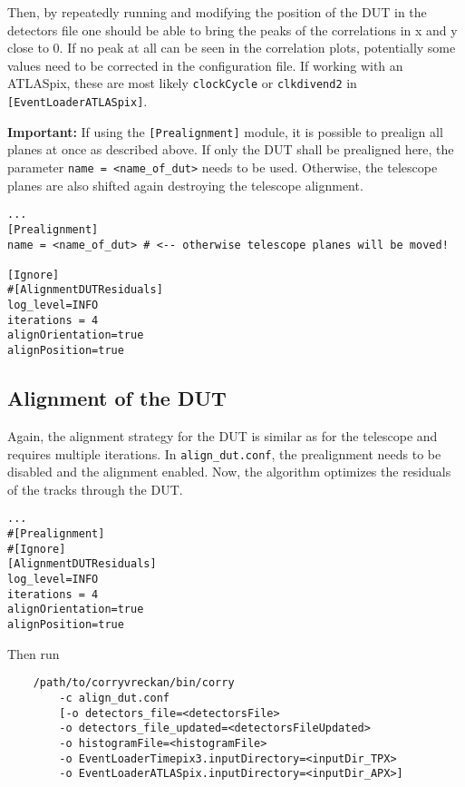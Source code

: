 Then, by repeatedly running \corry and modifying the position of the DUT in the detectors file one should be able to bring the peaks of the correlations in x and y close to 0.
If no peak at all can be seen in the correlation plots, potentially some values need to be corrected in the configuration file.
If working with an ATLASpix, these are most likely \texttt{clockCycle} or \texttt{clkdivend2} in \texttt{[EventLoaderATLASpix]}.

\textbf{Important: }If using the \texttt{[Prealignment]} module, it is possible to prealign all planes at once as described above.
If only the DUT shall be prealigned here, the parameter \texttt{name = <name\_of\_dut>} needs to be used.
Otherwise, the telescope planes are also shifted again destroying the telescope alignment.

\begin{verbatim}
...
[Prealignment]
name = <name_of_dut> # <-- otherwise telescope planes will be moved!

[Ignore]
#[AlignmentDUTResiduals]
log_level=INFO
iterations = 4
alignOrientation=true
alignPosition=true
\end{verbatim}

\subsection*{Alignment of the DUT}
Again, the alignment strategy for the DUT is similar as for the telescope and requires multiple iterations.
In \texttt{align\_dut.conf}, the prealignment needs to be disabled and the alignment enabled.
Now, the algorithm optimizes the residuals of the tracks through the DUT.

\begin{verbatim}
...
#[Prealignment]
#[Ignore]
[AlignmentDUTResiduals]
log_level=INFO
iterations = 4
alignOrientation=true
alignPosition=true
\end{verbatim}

Then run
\begin{verbatim}
    /path/to/corryvreckan/bin/corry 
    	-c align_dut.conf 
    	[-o detectors_file=<detectorsFile> 
    	-o detectors_file_updated=<detectorsFileUpdated> 
    	-o histogramFile=<histogramFile> 
    	-o EventLoaderTimepix3.inputDirectory=<inputDir_TPX>
    	-o EventLoaderATLASpix.inputDirectory=<inputDir_APX>]
\end{verbatim}

